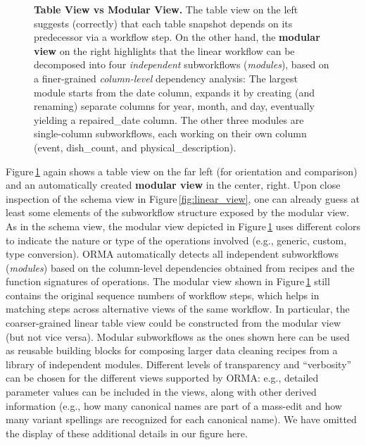 \documentclass[conference]{ijdc-v14}
\newcommand{\Figref}[1]{Figure\,\ref{#1}}
\newcommand{\orma}{\textsf{ORMA}\xspace}  %
\newcommand{\co}[1]{\textsf{\small{#1}}}
\begin{document}
\begin{figure}[t]
\caption{\textbf{Table View vs Modular View.}  The table view on the left suggests (correctly) that
  each table snapshot depends on its predecessor via a workflow step. On the other hand, the \textbf{modular
  view} on the right highlights that the linear workflow can be decomposed into four \emph{independent}
  subworkflows (\emph{modules}), based on a finer-grained \emph{column-level} dependency
  analysis: The largest module starts from the \co{date} column, expands it by creating (and
  renaming) separate columns for \co{year}, \co{month}, and \co{day}, eventually yielding a
  \co{repaired\_date} column. The other three modules are single-column subworkflows, each working
  on their own column (\co{event}, \co{dish\_count}, and \co{physical\_description}).}  
    \label{fig:parallel_view}
\end{figure}

\Figref{fig:parallel_view} again shows a table view on the far left (for orientation and comparison)
and an automatically created \textbf{modular view} in the center, right.  Upon close inspection of
the schema view in \Figref{fig:linear_view}, one can already guess at least some elements of the
subworkflow structure exposed by the modular view. As in the schema view, the modular view depicted
in \Figref{fig:parallel_view} uses different colors to indicate the nature or type of the operations
involved (e.g., generic, custom, type conversion). \orma automatically detects all independent
subworkflows (\emph{modules}) based on the column-level dependencies obtained from recipes and the
function signatures of operations. The modular view shown in \Figref{fig:parallel_view} still
contains the original sequence numbers of workflow steps, which helps in matching steps across
alternative views of the same workflow. In particular, the coarser-grained linear table view could
be constructed from the modular view (but not vice versa).  Modular subworkflows as the ones shown
here can be used as reusable building blocks for composing larger data cleaning recipes from a
library of independent modules. Different levels of transparency and ``verbosity'' can be chosen for
the different views supported by \orma: e.g., detailed parameter values can be included in the
views, along with other derived information (e.g., how many canonical names are part of a
\co{mass-edit} and how many variant spellings are recognized for each canonical name). 
We have omitted the display of these additional details in our figure here.
\end{document}
